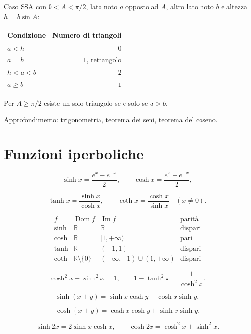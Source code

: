 Caso SSA con \(0<A<\pi/2\), lato noto \(a\) opposto ad \(A\), altro lato noto \(b\) e altezza \(h=b\sin A\):

\begin{longtable}[]{@{}lr@{}}
\toprule\noalign{}
Condizione & Numero di triangoli \\
\midrule\noalign{}
\endhead
\bottomrule\noalign{}
\endlastfoot
\(a<h\) & \(0\) \\
\(a=h\) & \(1\), rettangolo \\
\(h<a<b\) & \(2\) \\
\(a\ge b\) & \(1\) \\
\end{longtable}

Per \(A\ge\pi/2\) esiste un solo triangolo se e solo se \(a>b\).

Approfondimento: \href{https://ingegnerismo.it/matematica/trigonometria/}{trigonometria}, \href{https://ingegnerismo.it/matematica/teorema-dei-seni/}{teorema dei seni}, \href{https://ingegnerismo.it/matematica/teorema-del-coseno/}{teorema del coseno}.

\section{Funzioni iperboliche}\label{funzioni-iperboliche}

\[
\sinh x=\frac{e^x-e^{-x}}2,
\qquad
\cosh x=\frac{e^x+e^{-x}}2,
\]

\[
\tanh x=\frac{\sinh x}{\cosh x},
\qquad
\coth x=\frac{\cosh x}{\sinh x}\quad(x\ne0).
\]

\[
\begin{array}{c|c|c|c}
f&\operatorname{Dom}f&\operatorname{Im}f&\text{parità}\\
\hline
\sinh&\mathbb R&\mathbb R&\text{dispari}\\
\cosh&\mathbb R&[1,+\infty)&\text{pari}\\
\tanh&\mathbb R&(-1,1)&\text{dispari}\\
\coth&\mathbb R\setminus\{0\}&(-\infty,-1)\cup(1,+\infty)&\text{dispari}
\end{array}
\]

\[
\cosh^2x-\sinh^2x=1,
\qquad
1-\tanh^2x=\frac1{\cosh^2x}.
\]

\[
\sinh(x\pm y)=\sinh x\cosh y\pm\cosh x\sinh y,
\]

\[
\cosh(x\pm y)=\cosh x\cosh y\pm\sinh x\sinh y.
\]

\[
\sinh2x=2\sinh x\cosh x,
\qquad
\cosh2x=\cosh^2x+\sinh^2x.
\]

